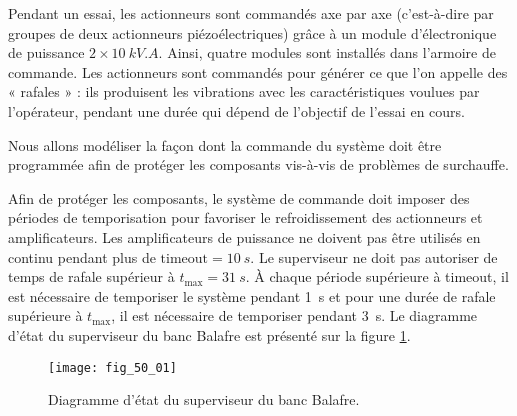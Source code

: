 \normaltrue \difficilefalse \tdifficilefalse
\correctionfalse

\setcounter{question}{0}
\ifcorrection
\else
{}
\fi

\ifprof
\else

Pendant un essai, les actionneurs sont commandés axe par axe (c’est-à-dire par groupes
de deux actionneurs piézoélectriques) grâce à un module d’électronique de puissance
$2\times \SI{10}{kV.A}$. Ainsi, quatre modules sont installés dans l’armoire de commande. Les actionneurs
sont commandés pour générer ce que l’on appelle des « rafales » : ils produisent
les vibrations avec les caractéristiques voulues par l’opérateur, pendant une durée qui
dépend de l’objectif de l’essai en cours.

\begin{obj}
Nous allons modéliser la façon dont la commande du système
doit être programmée afin de protéger les composants vis-à-vis de problèmes de surchauffe.
\end{obj}



Afin de protéger les composants, le système de commande doit imposer des périodes de
temporisation pour favoriser le refroidissement des actionneurs et amplificateurs. Les amplificateurs
de puissance ne doivent pas être utilisés en continu pendant plus de $\text{timeout} =
\SI{10}{s}$. Le superviseur ne doit pas autoriser de temps de rafale supérieur à $t_{\text{max}} = \SI{31}{s}$. À
chaque période supérieure à timeout, il est nécessaire de temporiser le système pendant
\SI{1}{s} et pour une durée de rafale supérieure à $t_{\text{max}}$, il est nécessaire de temporiser pendant
\SI{3}{s}.
Le diagramme d’état du superviseur du banc Balafre est présenté sur la figure \ref{fig_50_01}.


\begin{figure}[H]
\centering
\texttt{[image: fig\_50\_01]}
\caption{Diagramme d’état du superviseur du banc Balafre. \label{fig_50_01}}
\end{figure}

